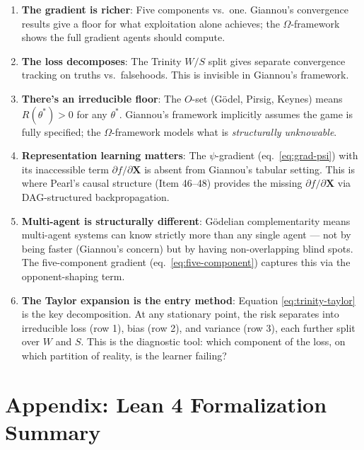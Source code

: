 \documentclass[11pt,a4paper]{article}
\newcommand{\bX}{\mathbf{X}}
\begin{document}
\begin{enumerate}
\item \textbf{The gradient is richer}: Five components vs.\ one. Giannou's convergence results give a floor for what exploitation alone achieves; the $\Omega$-framework shows the full gradient agents should compute.

\item \textbf{The loss decomposes}: The Trinity $W/S$ split gives separate convergence tracking on truths vs.\ falsehoods. This is invisible in Giannou's framework.

\item \textbf{There's an irreducible floor}: The $O$-set (G\"odel, Pirsig, Keynes) means $R(\theta^*) > 0$ for any $\theta^*$. Giannou's framework implicitly assumes the game is fully specified; the $\Omega$-framework models what is \emph{structurally unknowable}.

\item \textbf{Representation learning matters}: The $\psi$-gradient (eq.~\ref{eq:grad-psi}) with its inaccessible term $\partial f / \partial \bX$ is absent from Giannou's tabular setting. This is where Pearl's causal structure (Item 46--48) provides the missing $\partial f / \partial \bX$ via DAG-structured backpropagation.

\item \textbf{Multi-agent is structurally different}: G\"odelian complementarity means multi-agent systems can know strictly more than any single agent — not by being faster (Giannou's concern) but by having non-overlapping blind spots. The five-component gradient (eq.~\ref{eq:five-component}) captures this via the opponent-shaping term.

\item \textbf{The Taylor expansion is the entry method}: Equation \eqref{eq:trinity-taylor} is the key decomposition. At any stationary point, the risk separates into irreducible loss (row 1), bias (row 2), and variance (row 3), each further split over $W$ and $S$. This is the diagnostic tool: which component of the loss, on which partition of reality, is the learner failing?
\end{enumerate}


\newpage
\section*{Appendix: Lean 4 Formalization Summary}
\end{document}
